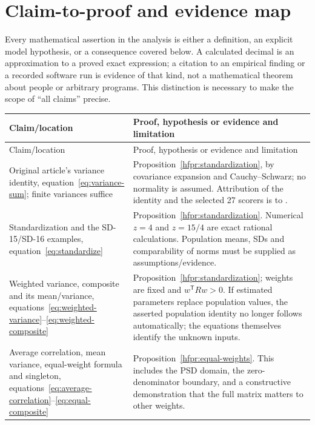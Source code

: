 \chapter{Claim-to-proof and evidence map}
\label{hfmap:main}

Every mathematical assertion in the analysis is either a definition, an
explicit model hypothesis, or a consequence covered below. A calculated
decimal is an approximation to a proved exact expression; a citation to an
empirical finding or a recorded software run is evidence of that kind,
not a mathematical theorem about people or arbitrary programs. This
distinction is necessary to make the scope of ``all claims'' precise.

\begingroup\small
\setlength{\tabcolsep}{4pt}
\begin{longtable}{>{\raggedright\arraybackslash}p{.35\linewidth}>{\raggedright\arraybackslash}p{.59\linewidth}}
\toprule
Claim/location & Proof, hypothesis or evidence and limitation\\
\midrule
\endfirsthead
\toprule Claim/location & Proof, hypothesis or evidence and limitation\\\midrule
\endhead
\bottomrule\endfoot
Original article's variance identity, equation~\ref{eq:variance-sum};
finite variances suffice &
Proposition~\ref{hfpr:standardization}, by covariance expansion and
Cauchy--Schwarz; no normality is assumed. Attribution of the identity and
the selected 27 scorers is to \citet{hoeflin}.\\
Standardization and the SD-15/SD-16 examples,
equation~\ref{eq:standardize} &
Proposition~\ref{hfpr:standardization}. Numerical \(z=4\) and
\(z=15/4\) are exact rational calculations. Population means, SDs and
comparability of norms must be supplied as assumptions/evidence.\\
Weighted variance, composite and its mean/variance,
equations~\ref{eq:weighted-variance}--\ref{eq:weighted-composite} &
Proposition~\ref{hfpr:standardization}; weights are fixed and
\(w^{\mathsf T}Rw>0\). If estimated parameters replace population
values, the asserted population identity no longer follows automatically;
the equations themselves identify the unknown inputs.\\
Average correlation, mean variance, equal-weight formula and singleton,
equations~\ref{eq:average-correlation}--\ref{eq:equal-composite} &
Proposition~\ref{hfpr:equal-weights}. This includes the PSD domain,
the zero-denominator boundary, and a constructive demonstration that the
full matrix matters to other weights.\\

\end{longtable}
